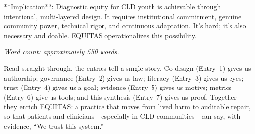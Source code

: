 \documentclass[12pt,twoside]{article}
\begin{document}
**Implication**: Diagnostic equity for CLD youth is achievable through intentional, multi-layered design. It requires institutional commitment, genuine community power, technical rigor, and continuous adaptation. It's hard; it's also necessary and doable. EQUITAS operationalizes this possibility.

\emph{Word count: approximately 550 words.}

\vspace{1cm}
\noindent Read straight through, the entries tell a single story. Co-design (Entry~1) gives us authorship; governance (Entry~2) gives us law; literacy (Entry~3) gives us eyes; trust (Entry~4) gives us a goal; evidence (Entry~5) gives us motive; metrics (Entry~6) give us tools; and this synthesis (Entry~7) gives us proof. Together they enrich \textsc{EQUITAS}: a practice that moves from lived harm to auditable repair, so that patients and clinicians---especially in CLD communities---can say, with evidence, ``We trust this system.''
\end{document}
